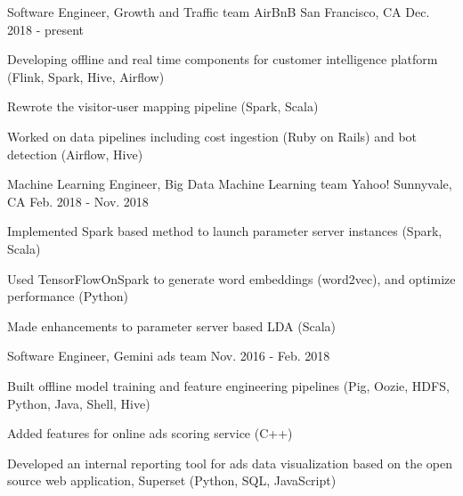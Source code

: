 

\begin{cventries}

  \cventry
    {Software Engineer, Growth and Traffic team} %
    {AirBnB} %
    {San Francisco, CA} %
    {Dec. 2018 - present} %
    {
      \begin{cvitems} %
        \item {Developing offline and real time components for customer intelligence platform (Flink, Spark, Hive, Airflow)}
        \item {Rewrote the visitor-user mapping pipeline (Spark, Scala)}
        \item {Worked on data pipelines including cost ingestion (Ruby on Rails) and bot detection (Airflow, Hive)}
      \end{cvitems}
    }

  \cventry
    {Machine Learning Engineer, Big Data Machine Learning team} %
    {Yahoo!} %
    {Sunnyvale, CA} %
    {Feb. 2018 - Nov. 2018} %
    {
      \begin{cvitems} %
        \item {Implemented Spark based method to launch parameter server instances (Spark, Scala)}
        \item {Used TensorFlowOnSpark to generate word embeddings (word2vec), and optimize performance (Python)}
        \item {Made enhancements to parameter server based LDA (Scala)}
      \end{cvitems}
    }

  \cventry
    {Software Engineer, Gemini ads team} %
    {} %
    {} %
    {Nov. 2016 - Feb. 2018} %
    {
      \begin{cvitems} %
        \item {Built offline model training and feature engineering pipelines (Pig, Oozie, HDFS, Python, Java, Shell, Hive)}
        \item {Added features for online ads scoring service (C++)}
        \item {Developed an internal reporting tool for ads data visualization based on the open source web application,
Superset (Python, SQL, JavaScript)}
      \end{cvitems}
    }
    

\end{cventries}
